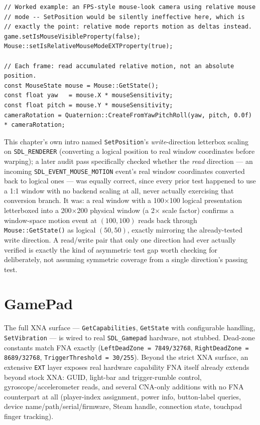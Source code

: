 \begin{lstlisting}
// Worked example: an FPS-style mouse-look camera using relative mouse
// mode -- SetPosition would be silently ineffective here, which is
// exactly the point: relative mode reports motion as deltas instead.
game.setIsMouseVisibleProperty(false);
Mouse::setIsRelativeMouseModeEXTProperty(true);

// Each frame: read accumulated relative motion, not an absolute position.
const MouseState mouse = Mouse::GetState();
const float yaw   = mouse.X * mouseSensitivity;
const float pitch = mouse.Y * mouseSensitivity;
cameraRotation = Quaternion::CreateFromYawPitchRoll(yaw, pitch, 0.0f) * cameraRotation;
\end{lstlisting}

This chapter's own intro named \texttt{SetPosition}'s \emph{write}-direction letterbox scaling on \texttt{SDL\_RENDERER} (converting a logical position to real window coordinates before warping); a later audit pass specifically checked whether the \emph{read} direction --- an incoming \texttt{SDL\_EVENT\_MOUSE\_MOTION} event's real window coordinates converted back to logical ones --- was equally correct, since every prior test happened to use a 1:1 window with no backend scaling at all, never actually exercising that conversion branch. It was: a real window with a 100$\times$100 logical presentation letterboxed into a 200$\times$200 physical window (a 2$\times$ scale factor) confirms a window-space motion event at $(100, 100)$ reads back through \texttt{Mouse::GetState()} as logical $(50, 50)$, exactly mirroring the already-tested write direction. A read/write pair that only one direction had ever actually verified is exactly the kind of asymmetric test gap worth checking for deliberately, not assuming symmetric coverage from a single direction's passing test.

\section{GamePad}

The full XNA surface --- \texttt{GetCapabilities}, \texttt{GetState} with configurable
 handling, \texttt{SetVibration} --- is wired to real
\texttt{SDL\_Gamepad} hardware, not stubbed. Dead-zone constants match FNA exactly
(\texttt{LeftDeadZone = 7849/32768}, \texttt{RightDeadZone = 8689/32768},
\texttt{TriggerThreshold = 30/255}). Beyond the strict XNA surface, an extensive
\texttt{EXT} layer exposes real hardware capability FNA itself already extends beyond stock
XNA: GUID, light-bar and trigger-rumble control, gyroscope/accelerometer reads, and several
CNA-only additions with no FNA counterpart at all (player-index assignment, power info,
button-label queries, device name/path/serial/firmware, Steam handle, connection state,
touchpad finger tracking).

